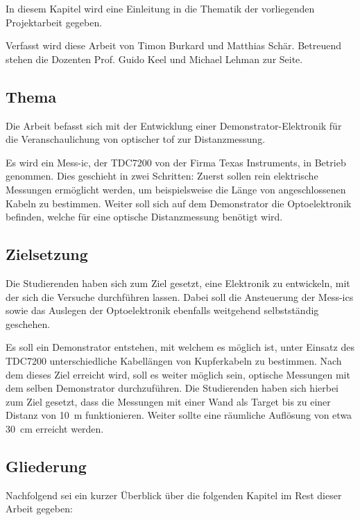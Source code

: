 In diesem Kapitel wird eine Einleitung in die Thematik der vorliegenden Projektarbeit gegeben.

Verfasst wird diese Arbeit von Timon Burkard und Matthias Schär. Betreuend stehen die Dozenten Prof. Guido Keel und
Michael Lehman zur Seite.

\subsection{Thema}
Die Arbeit befasst sich mit der Entwicklung einer Demonstrator-Elektronik für die Veranschaulichung von optischer \acrfull{tof} zur
Distanzmessung.

Es wird ein Mess-\acrshort{ic}, der TDC7200 von der Firma Texas Instruments, in Betrieb genommen. Dies geschieht in zwei
Schritten: Zuerst sollen rein elektrische Messungen ermöglicht werden, um beispielsweise die Länge von angeschlossenen
Kabeln zu bestimmen. Weiter soll sich auf dem Demonstrator die Optoelektronik befinden, welche für eine optische
Distanzmessung benötigt wird.

\subsection{Zielsetzung}
Die Studierenden haben sich zum Ziel gesetzt, eine Elektronik zu entwickeln, mit der sich die Versuche durchführen
lassen. Dabei soll die Ansteuerung der Mess-\acrshort{ic}s sowie das Auslegen der Optoelektronik ebenfalls weitgehend
selbstständig geschehen.

Es soll ein Demonstrator entstehen, mit welchem es möglich ist, unter Einsatz des TDC7200 unterschiedliche Kabellängen von
Kupferkabeln zu bestimmen. Nach dem dieses Ziel erreicht wird, soll es weiter möglich sein, optische Messungen mit dem
selben Demonstrator durchzuführen. Die Studierenden haben sich hierbei zum Ziel gesetzt, dass die Messungen mit einer Wand
als Target bis zu einer Distanz von 10~m funktionieren. Weiter sollte eine räumliche Auflösung von etwa 30~cm erreicht werden.

\subsection{Gliederung}
Nachfolgend sei ein kurzer Überblick über die folgenden Kapitel im Rest dieser Arbeit gegeben:

